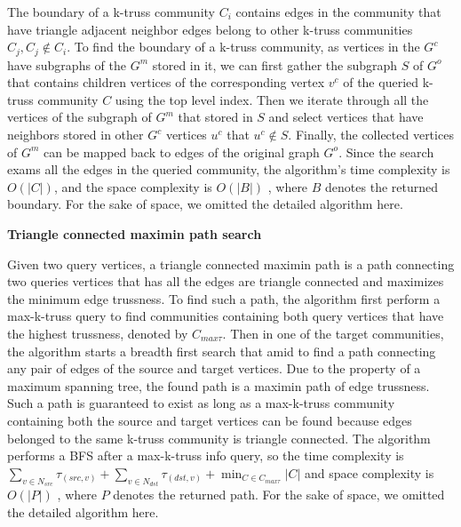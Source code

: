 The boundary of a k-truss community $C_i$ contains edges in the community that have triangle adjacent neighbor edges belong to other k-truss communities $C_j, C_j \notin C_i$. To find the boundary of a k-truss community, as vertices in the \treeindex{} $G^c$ have subgraphs of the \inducedgraph{} $G^m$ stored in it, we can first gather the subgraph $S$ of $G^o$ that contains children vertices of the corresponding vertex $v^c$ of the queried k-truss community $C$ using the top level index. Then we iterate through all the vertices of the subgraph of $G^m$ that stored in $S$ and select vertices that have neighbors stored in other $G^c$ vertices $u^c$ that $u^c \notin S$. Finally, the collected vertices of $G^m$ can be mapped back to edges of the original graph $G^o$. Since the search exams all the edges in the queried community, the algorithm's time complexity is $O(|C|)$, and the space complexity is $O(|B|)$ , where $B$ denotes the returned boundary. For the sake of space, we omitted the detailed algorithm here.

\vskip 0.1in \noindent \textbf{Triangle connected maximin path search}

Given two query vertices, a triangle connected maximin path is a path connecting two queries vertices that has all the edges are triangle connected and maximizes the minimum edge trussness. To find such a path, the algorithm first perform a max-k-truss \toplevelprob{} query to find communities containing both query vertices that have the highest trussness, denoted by $C_{max\tau}$. Then in one of the target communities, the algorithm starts a breadth first search that amid to find a path connecting any pair of edges of the source and target vertices. Due to the property of a maximum spanning tree, the found path is a maximin path of edge trussness. Such a path is guaranteed to exist as long as a max-k-truss community containing both the source and target vertices can be found because edges belonged to the same k-truss community is triangle connected. The algorithm performs a BFS after a max-k-truss info query, so the time complexity is $\sum_{v \in N_{src}}{\tau_{(src,v)}} + \sum_{v \in N_{dst}}{\tau_{(dst,v)}} + \min_{C \in C_{max\tau}}{|C|}$ and space complexity is $O(|P|)$ , where $P$ denotes the returned path. For the sake of space, we omitted the detailed algorithm here.
